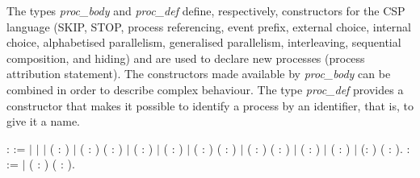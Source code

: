 The types \emph{proc\_body} and \emph{proc\_def} define, respectively, constructors for the CSP language (SKIP, STOP, process referencing, event prefix, external choice, internal choice, alphabetised parallelism, generalised parallelism, interleaving, sequential composition, and hiding) and are used to declare new processes (process attribution statement). The constructors made available by \emph{proc\_body} can be combined in order to describe complex behaviour. The type \emph{proc\_def} provides a constructor that makes it possible to identify a process by an identifier, that is, to give it a name.

\begin{coqdoccode}
	\coqdocnoindent
	  :  :=\coqdoceol
	\coqdocindent{1.00em}
	\ensuremath{|} \coqdoceol
	\coqdocindent{1.00em}
	\ensuremath{|} \coqdoceol
	\coqdocindent{1.00em}
	\ensuremath{|}  ( : )\coqdoceol
	\coqdocindent{1.00em}
	\ensuremath{|}  ( : ) ( : )\coqdoceol
	\coqdocindent{1.00em}
	\ensuremath{|}  (  : )\coqdoceol
	\coqdocindent{1.00em}
	\ensuremath{|}  (  : )\coqdoceol
	\coqdocindent{1.00em}
	\ensuremath{|}  (  : ) (  : )\coqdoceol
	\coqdocindent{1.00em}
	\ensuremath{|}  (  : ) ( : )\coqdoceol
	\coqdocindent{1.00em}
	\ensuremath{|}  (  : )\coqdoceol
	\coqdocindent{1.00em}
	\ensuremath{|}  (  : )\coqdoceol
	\coqdocindent{1.00em}
	\ensuremath{|}  (: ) ( : ).\coqdoceol
	\coqdocnoindent
	  :  :=\coqdoceol
	\coqdocindent{1.00em}
	\ensuremath{|}  ( : ) ( : ).\coqdoceol
\end{coqdoccode}

